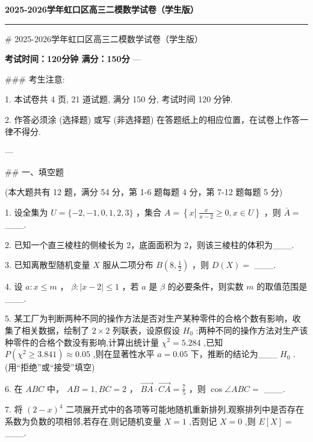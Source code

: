 \documentclass[11pt,a4paper]{article}
\renewcommand{\geq}{\geqslant}
\renewcommand{\leq}{\leqslant}
\begin{document}
{\centering\Large\bfseries 2025-2026学年虹口区高三二模数学试卷（学生版）\par}
\vspace{0.3em}
\hrule
\vspace{0.5em}

# 2025-2026学年虹口区高三二模数学试卷（学生版）

\textbf{考试时间：120分钟  满分：150分}
---

### 考生注意:

1. 本试卷共 4 页, 21 道试题, 满分 150 分, 考试时间 120 分钟.

2. 作答必须涂 (选择题) 或写 (非选择题) 在答题纸上的相应位置，在试卷上作答一律不得分.

---


## 一、填空题

(本大题共有 12 题，满分 54 分，第 1-6 题每题 4 分，第 7-12 题每题 5 分)


1. 设全集为 $U = \{  - 2, - 1,0,1,2,3\}$ ，集合 $A = \left\{  {x\left| {\;\frac{x}{x - 2} \geq  0}\right. , x \in  U}\right\}$ ，则 $\bar{A} =$ ___.



2. 已知一个直三棱柱的侧棱长为 2，底面面积为 2，则该三棱柱的体积为___.



3. 已知离散型随机变量 $X$ 服从二项分布 $B\left( {8,\frac{1}{2}}\right)$ ，则 $D\left( X\right)  =$ ___.



4. 设 $a : x \leq  m$ ， $\beta  : \left| {x - 2}\right|  \leq  1$ ，若 $a$ 是 $\beta$ 的必要条件，则实数 $m$ 的取值范围是___.



5. 某工厂为判断两种不同的操作方法是否对生产某种零件的合格个数有影响，收集了相关数据，绘制了 $2 \times  2$ 列联表，设原假设 ${H}_{0}$ :两种不同的操作方法对生产该种零件的合格个数没有影响,计算出统计量 ${\chi }^{2} = {5.284}$ ,已知 $P\left( {{\chi }^{2} \geq  {3.841}}\right)  \approx  {0.05}$ ,则在显著性水平 $a = {0.05}$ 下，推断的结论为___ ${H}_{0}$ . (用“拒绝”或“接受”填空)



6. 在 ${ABC}$ 中， ${AB} = 1,{BC} = 2$ ， $\overrightarrow{BA} \cdot  \overrightarrow{CA} = \frac{7}{5}$ ，则 $\cos \angle {ABC} =$ ___.



7. 将 ${\left( 2 - x\right) }^{4}$ 二项展开式中的各项等可能地随机重新排列,观察排列中是否存在系数为负数的项相邻,若存在,则记随机变量 $X = 1$ ,否则记 $X = 0$ ,则 $E\left\lbrack  X\right\rbrack   =$ ___.
\end{document}
